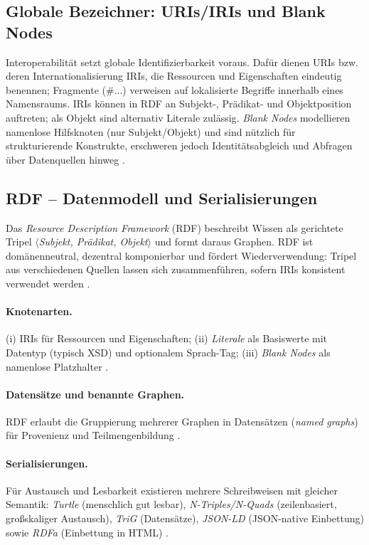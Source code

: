 \subsection{Globale Bezeichner: URIs/IRIs und Blank Nodes}

Interoperabilität setzt globale Identifizierbarkeit voraus. Dafür dienen URIs bzw. deren Internationalisierung IRIs, die Ressourcen und Eigenschaften eindeutig benennen; Fragmente (\#...) verweisen auf lokalisierte Begriffe innerhalb eines Namensraums. IRIs können in RDF an Subjekt-, Prädikat- und Objektposition auftreten; als Objekt sind alternativ Literale zulässig. \emph{Blank Nodes} modellieren namenlose Hilfsknoten (nur Subjekt/Objekt) und sind nützlich für strukturierende Konstrukte, erschweren jedoch Identitätsabgleich und Abfragen über Datenquellen hinweg \cite{RDF11Primer,Hitzler}.

\subsection{RDF -- Datenmodell und Serialisierungen}
\label{subsec:rdf}

Das \emph{Resource Description Framework} (RDF) beschreibt Wissen als gerichtete Tripel
\(\langle\)\emph{Subjekt, Prädikat, Objekt}\(\rangle\) und formt daraus Graphen. RDF ist domänenneutral, dezentral komponierbar und fördert Wiederverwendung: Tripel aus verschiedenen Quellen lassen sich zusammenführen, sofern IRIs konsistent verwendet werden \cite{RDF11Primer,AntoniouVanHarmelen,Hitzler}.

\paragraph{Knotenarten.} (i) IRIs für Ressourcen und Eigenschaften; (ii) \emph{Literale} als Basiswerte mit Datentyp (typisch XSD) und optionalem Sprach-Tag; (iii) \emph{Blank Nodes} als namenlose Platzhalter \cite{RDF11Primer}.

\paragraph{Datensätze und benannte Graphen.} RDF erlaubt die Gruppierung mehrerer Graphen in Datensätzen (\emph{named graphs}) für Provenienz und Teilmengenbildung \cite{RDF11Primer}.

\paragraph{Serialisierungen.} Für Austausch und Lesbarkeit existieren mehrere Schreibweisen mit gleicher Semantik: \emph{Turtle} (menschlich gut lesbar), \emph{N-Triples/N-Quads} (zeilenbasiert, großskaliger Austausch), \emph{TriG} (Datensätze), \emph{JSON-LD} (JSON-native Einbettung) sowie \emph{RDFa} (Einbettung in HTML) \cite{RDF11Primer}.

